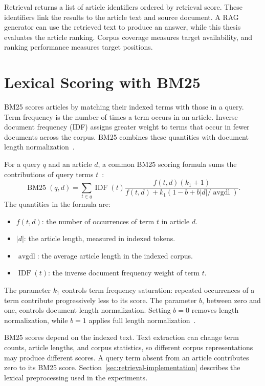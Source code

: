 Retrieval returns a list of article identifiers ordered by retrieval score. These identifiers link the results to the article text and source document. A RAG generator can use the retrieved text to produce an answer, while this thesis evaluates the article ranking. Corpus coverage measures target availability, and ranking performance measures target positions.

\section{Lexical Scoring with BM25}

BM25 scores articles by matching their indexed terms with those in a query. Term frequency is the number of times a term occurs in an article. Inverse document frequency (IDF) assigns greater weight to terms that occur in fewer documents across the corpus. BM25 combines these quantities with document length normalization~\cite{manning2008}.

For a query \(q\) and an article \(d\), a common BM25 scoring formula sums the contributions of query terms \(t\)~\cite{robertson2009}:
\[
\operatorname{BM25}(q,d)=\sum_{t\in q}\operatorname{IDF}(t)
\frac{f(t,d)(k_1+1)}{f(t,d)+k_1\left(1-b+b|d|/\operatorname{avgdl}\right)}.
\]
The quantities in the formula are:
\begin{itemize}
    \item \(f(t,d)\): the number of occurrences of term \(t\) in article \(d\).
    \item \(|d|\): the article length, measured in indexed tokens.
    \item \(\operatorname{avgdl}\): the average article length in the indexed corpus.
    \item \(\operatorname{IDF}(t)\): the inverse document frequency weight of term \(t\).
\end{itemize}

The parameter \(k_1\) controls term frequency saturation: repeated occurrences of a term contribute progressively less to its score. The parameter \(b\), between zero and one, controls document length normalization. Setting \(b=0\) removes length normalization, while \(b=1\) applies full length normalization~\cite{manning2008}.

BM25 scores depend on the indexed text. Text extraction can change term counts, article lengths, and corpus statistics, so different corpus representations may produce different scores. A query term absent from an article contributes zero to its BM25 score. Section~\ref{sec:retrieval-implementation} describes the lexical preprocessing used in the experiments.

